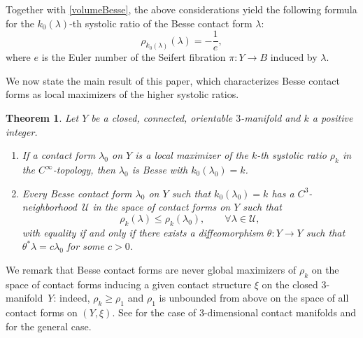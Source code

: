 \documentclass[11pt]{article}
\numberwithin{equation}{section}
\newenvironment{enumeratei}
{\bgroup\def\theenumi{\roman{enumi}}\def\theenumii{\arabic{enumii}}\begin{enumerate}}
{\end{enumerate}\egroup}
\newtheorem{maintheorem}{Theorem}
\theoremstyle{definition}
\newcommand{\UU}{\mathcal{U}}
\let\eul e
\begin{document}
Together with \eqref{volumeBesse}, the above considerations yield the following formula for the $k_0(\lambda)$-th systolic ratio of the Besse contact form $\lambda$:
\[
\rho_{k_0(\lambda)} (\lambda) = - \frac{1}{\eul},
\]
where $\eul$ is the Euler number of the Seifert fibration $\pi:Y\to B$ induced by $\lambda$.

We now state the main result of this paper, which characterizes Besse contact forms as local maximizers of the higher systolic ratios.

\begin{maintheorem}
\label{t:main}
Let $Y$ be a closed, connected, orientable $3$-manifold and $k$ a positive integer.
\begin{enumeratei}
\item\label{t:maini}
 If a contact form $\lambda_0$ on $Y$ is a local maximizer of the $k$-th systolic ratio $\rho_k$ in the $C^{\infty}$-topology, then $\lambda_0$ is Besse with $k_0(\lambda_0)=k$.

\item\label{t:mainii}
Every Besse contact form $\lambda_0$ on $Y$ such that $k_0(\lambda_0)=k$ has a $C^3$-neighbor\-hood~$\UU$ in the space of contact forms on $Y$ such that
\[
\rho_k(\lambda) \leq \rho_k(\lambda_0), \qquad \forall \lambda\in \UU,
\]
with equality if and only if there exists a diffeomorphism $\theta:Y\to Y$ such that $\theta^*\lambda=c\lambda_0$ for some $c>0$.
\end{enumeratei}
\end{maintheorem}

We remark that Besse contact forms are never global maximizers of $\rho_k$ on the space of contact forms inducing a given contact structure $\xi$ on the closed $3$-manifold~$Y$: indeed, $\rho_k\geq \rho_1$ and $\rho_1$ is unbounded from above on the space of all contact forms on $(Y,\xi)$. See \cite{Abbondandolo:2019ta} for the case of 3-dimensional contact manifolds and \cite{Saglam:2018tb} for the general case.
\end{document}
